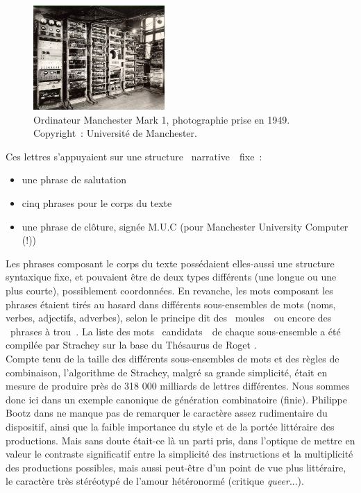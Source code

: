 \documentclass{article}
\begin{document}
				\begin{figure}[H]
					\centering
					\includegraphics[width=5cm]{manchester_mark_1.jpg}
					\caption{Ordinateur Manchester Mark 1, photographie prise en 1949. Copyright~: Université de Manchester.}
					\label{fig:manchester_mark_1}
				\end{figure}
				Ces lettres s'appuyaient sur une structure \guillemotleft~narrative~\guillemotright~fixe~:
				\vspace{2mm}
				\begin{itemize}
					\item une phrase de salutation
					\item cinq phrases pour le corps du texte
					\item une phrase de clôture, signée M.U.C (pour Manchester University Computer (!))
				\end{itemize}
				\vspace{2mm}
				Les phrases composant le corps du texte possédaient elles-aussi une structure syntaxique fixe, et pouvaient être de deux types différents (une longue ou une plus courte), possiblement coordonnées. En revanche, les mots composant les phrases étaient tirés au hasard dans différents sous-ensembles de mots (noms, verbes, adjectifs, adverbes), selon le principe dit des \guillemotleft~moules~\guillemotright~ou encore des \guillemotleft~phrases à trou~\guillemotright.  La liste des mots \guillemotleft~candidats~\guillemotright~de chaque sous-ensemble a été compilée par Strachey sur la base du Thésaurus de Roget \autocite{wiki:roget}.\\
				
				Compte tenu de la taille des différents sous-ensembles de mots et des règles de combinaison, l'algorithme de Strachey, malgré sa grande simplicité, était en mesure  de produire près de 318 000 milliards de lettres différentes.  Nous sommes donc ici dans un exemple canonique de génération combinatoire (finie). Philippe Bootz dans \autocite{bootz} ne manque pas de remarquer le caractère assez rudimentaire du dispositif, ainsi que la faible importance du style et de la portée littéraire des productions. Mais sans doute était-ce là un parti pris, dans l'optique de mettre en valeur le contraste significatif entre la simplicité des instructions et la multiplicité des productions possibles, mais aussi  peut-être d'un point de vue plus littéraire, le caractère très stéréotypé de l'amour hétéronormé (critique \textit{queer}...).\\
				
\end{document}
